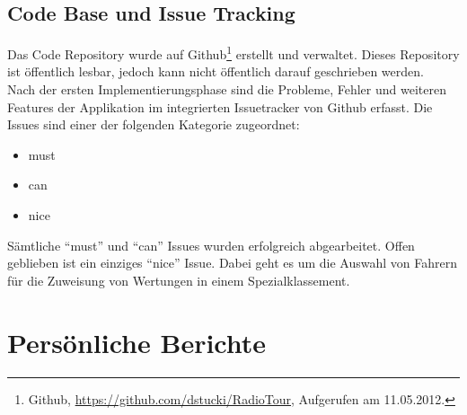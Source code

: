 \subsection{Code Base und Issue Tracking}
Das Code Repository wurde auf Github\footnote{Github, \url{https://github.com/dstucki/RadioTour}, Aufgerufen am 11.05.2012.} erstellt und verwaltet. Dieses Repository ist öffentlich lesbar, jedoch kann nicht öffentlich darauf geschrieben werden.
\\
Nach der ersten Implementierungsphase sind die Probleme, Fehler und weiteren Features der Applikation im integrierten Issuetracker von Github erfasst. Die Issues sind einer der folgenden Kategorie zugeordnet:

\begin{itemize}
\item must
\item can
\item nice
\end{itemize}

Sämtliche "`must"' und "`can"' Issues wurden erfolgreich abgearbeitet. Offen geblieben ist ein einziges "`nice"' Issue. Dabei geht es um die Auswahl von Fahrern für die Zuweisung von Wertungen in einem Spezialklassement.


\section{Persönliche Berichte}

